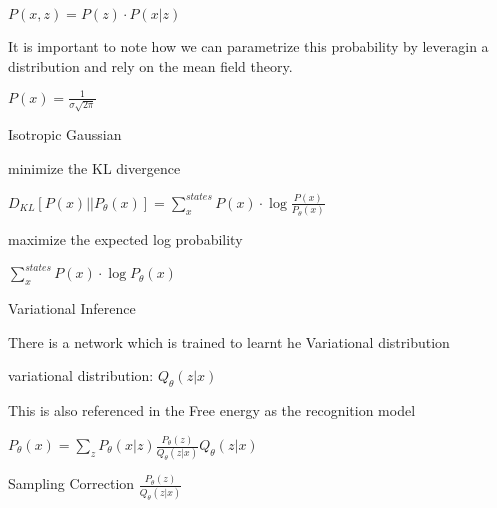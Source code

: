 \documentclass{amsart}
\begin{document}
$P(x,z) = P(z) \cdot P(x|z) $

It is important to note how we can parametrize this probability by leveragin a distribution and rely on the mean field theory.

$P(x) = \frac{1}{\sigma\sqrt{2\pi}}$



Isotropic Gaussian

minimize the KL divergence

$D_{KL}[P(x) || P_{\theta}(x)] = \sum\limits_{x}^{states}P(x)\cdot \log\frac{P(x)}{P_{\theta}(x)}$

maximize the expected log probability

$\sum\limits_{x}^{states}P(x)\cdot \log P_{\theta}(x) $



Variational Inference

There is a network which is trained to learnt he Variational distribution

variational distribution: $Q_{\theta}(z|x)$

This is also referenced in the Free energy as the recognition model

$P_{\theta}(x) = \sum\limits_{z}P_{\theta}(x|z)\frac{P_{\theta}(z)}{Q_{\theta}(z|x)}Q_{\theta}(z|x) $

Sampling Correction $\frac{P_{\theta}(z)}{Q_{\theta}(z|x)}$



\clearpage
\end{document}
